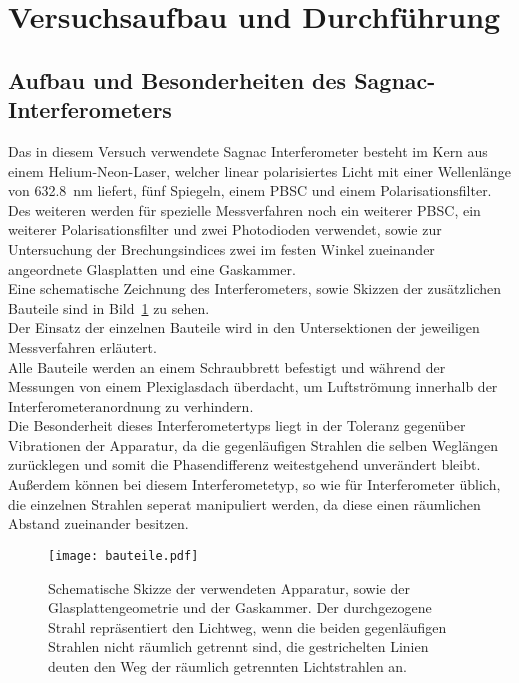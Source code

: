 
\section{Versuchsaufbau und Durchführung}

\subsection{Aufbau und Besonderheiten des Sagnac-Interferometers}
%
Das in diesem Versuch verwendete Sagnac Interferometer besteht im 
Kern aus einem Helium-Neon-Laser, welcher linear polarisiertes 
Licht mit einer Wellenlänge von \SI{632.8}{\nano\metre} liefert, 
fünf Spiegeln, einem PBSC und einem Polarisationsfilter.\\
Des weiteren werden für spezielle Messverfahren noch ein weiterer 
PBSC, ein weiterer Polarisationsfilter und zwei Photodioden 
verwendet, sowie zur Untersuchung der Brechungsindices zwei im 
festen Winkel zueinander angeordnete Glasplatten und eine Gaskammer.\\
Eine schematische Zeichnung des Interferometers, sowie Skizzen der 
zusätzlichen Bauteile sind in Bild~\ref{fig:bauteile} zu sehen.\\
Der Einsatz der einzelnen Bauteile wird in den Untersektionen 
der jeweiligen Messverfahren erläutert.\\
Alle Bauteile werden an einem Schraubbrett befestigt und während 
der Messungen von einem Plexiglasdach überdacht, um Luftströmung 
innerhalb der Interferometeranordnung zu verhindern.\\
Die Besonderheit dieses Interferometertyps liegt in der 
Toleranz gegenüber Vibrationen der Apparatur, da die gegenläufigen 
Strahlen die selben Weglängen zurücklegen und somit die 
Phasendifferenz weitestgehend unverändert bleibt. Außerdem können  
bei diesem Interferometetyp, so wie für Interferometer üblich, die 
einzelnen Strahlen seperat manipuliert werden, da diese einen 
räumlichen Abstand zueinander besitzen.\\
%
\begin{figure}[]
  \centering
  \texttt{[image: bauteile.pdf]}
  \caption{Schematische Skizze der verwendeten Apparatur, sowie der 
   Glasplattengeometrie und der Gaskammer. Der durchgezogene Strahl 
    repräsentiert den Lichtweg, wenn die beiden gegenläufigen 
    Strahlen nicht räumlich getrennt sind, die gestrichelten Linien 
     deuten den Weg der räumlich getrennten Lichtstrahlen an.}
  \label{fig:bauteile}
\end{figure}
%
